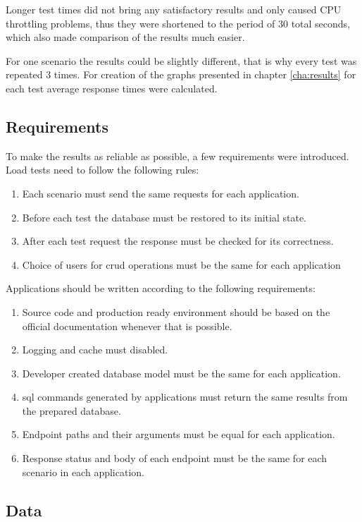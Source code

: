 Longer test times did not bring any satisfactory results and only caused CPU throttling problems, thus they were shortened to the period of 30 total seconds, which also made comparison of the results much easier.

For one scenario the results could be slightly different, that is why every test was repeated 3 times. For creation of the graphs presented in chapter \ref{cha:results} for each test average response times were calculated.


\subsection{Requirements}

To make the results as reliable as possible, a few requirements were introduced. Load tests need to follow the following rules:
\begin{enumerate}
  \item Each scenario must send the same requests for each application.
  \item Before each test the database must be restored to its initial state.
  \item After each test request the response must be checked for its correctness.
  \item Choice of users for \acrshort{crud} operations must be the same for each application
\end{enumerate}

Applications should be written according to the following requirements:
\begin{enumerate}
  \item Source code and production ready environment should be based on the official documentation whenever that is possible.
  \item Logging and cache must disabled.
  \item Developer created database model must be the same for each application.
  \item \acrshort{sql} commands generated by applications must return the same results from the prepared database.
  \item Endpoint paths and their arguments must be equal for each application.
  \item Response status and body of each endpoint must be the same for each scenario in each application.
\end{enumerate}

\subsection{Data}\label{sub:population}

